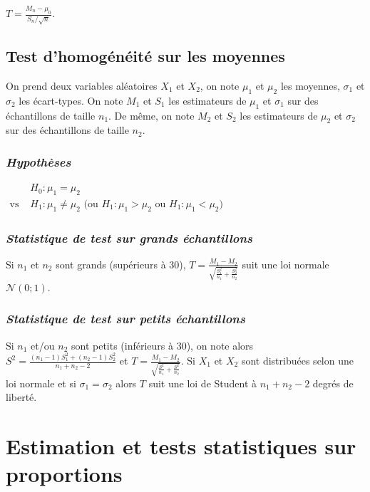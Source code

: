 \documentclass[12pt, a4paper]{article}
\begin{document}
 \hspace{3cm} $\displaystyle T=\frac{M_n-\mu_0}{S_n/\sqrt{n}}$.

\subsection{Test d'homogénéité sur les moyennes}
On prend deux variables aléatoires $X_1$ et $X_2$, on note $\mu_1$ et $\mu_2$ les moyennes, $\sigma_1$ et
$\sigma_2$ les écart-types.
On note $M_1$ et $S_1$ les estimateurs de $\mu_1$ et $\sigma_1$ sur des échantillons de taille $n_1$.
De même, on note $M_2$ et $S_2$ les estimateurs de $\mu_2$ et $\sigma_2$ sur des échantillons de taille $n_2$.

\subsubsection*{\it Hypothèses}
\begin{center}
$\begin{array}{ll}
 & H_0: \mu_1 = \mu_2 \\
\mbox{vs }& H_1: \mu_1 \neq \mu_2  \mbox{ (ou } H_1 : \mu_1 > \mu_2 \mbox{ ou } H_1 : \mu_1 < \mu_2 \mbox{)} 
\end{array}$
\end{center}


\subsubsection*{\it Statistique de test sur grands échantillons}
Si $n_1$ et $n_2$ sont grands (supérieurs à 30),
$\displaystyle T=\frac{M_1-M_2}{\sqrt{\frac{S_1^2}{n_1}+\frac{S_2^2}{n_2}} }$ suit une loi normale $\mathcal{N}(0;1)$.

\subsubsection*{\it Statistique de test sur petits échantillons} 
Si $n_1$ et/ou $n_2$ sont petits (inférieurs à 30),
on note alors $\displaystyle S^2=\frac{(n_1-1)S_1^2+(n_2-1)S_2^2}{n_1 + n_2-2}$ et 
$\displaystyle T=\frac{M_1-M_2}{\sqrt{\frac{S^2}{n_1}+\frac{S^2}{n_2}} }$.
Si $X_1$ et $X_2$ sont distribuées selon une loi normale et si $\sigma_1=\sigma_2$ alors $T$ suit
une loi de Student à $n_1+n_2-2$ degrés de liberté.

\section{Estimation et tests statistiques sur proportions}
\end{document}
